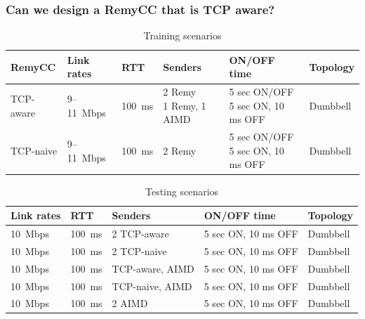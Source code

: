 \begin{frame}
\frametitle{Can we design a RemyCC that is TCP aware?}
\begin{table}
\begin{center}
\begin{tiny}
\begin{tabular}{l|l|l|l|l|l}
\bf RemyCC & \bf Link rates & \bf RTT & \bf Senders & ON/OFF time & Topology \\
\hline
TCP-aware  & 9--11~Mbps & 100~ms & \pbox{2.5cm}{2 Remy \\ 1 Remy, 1 AIMD}  & \pbox{2.5cm}{5 sec ON/OFF \\ 5 sec ON, 10 ms OFF} & Dumbbell\\
\hline
TCP-naive  & 9--11~Mbps & 100~ms & 2 Remy  & \pbox{2.5cm}{5 sec ON/OFF \\ 5 sec ON, 10 ms OFF} & Dumbbell\\
\hline
\end{tabular}
\end{tiny}
\caption{Training scenarios}
\label{table:oprange}
\end{center}
\end{table}

\begin{table}
\begin{center}
\begin{tiny}
\begin{tabular}{l|l|l|l|l}
\bf Link rates & \bf RTT & \bf Senders & ON/OFF time & Topology \\
\hline
10~Mbps & 100~ms & 2 TCP-aware & 5 sec ON, 10 ms OFF & Dumbbell\\
10~Mbps & 100~ms & 2 TCP-naive & 5 sec ON, 10 ms OFF & Dumbbell\\
10~Mbps & 100~ms & TCP-aware, AIMD & 5 sec ON, 10 ms OFF & Dumbbell\\
10~Mbps & 100~ms & TCP-naive, AIMD & 5 sec ON, 10 ms OFF & Dumbbell\\
10~Mbps & 100~ms & 2 AIMD  & 5 sec ON, 10 ms OFF & Dumbbell\\
\end{tabular}
\end{tiny}
\caption{Testing scenarios}
\label{table:oprange}
\end{center}
\end{table}

\end{frame}

